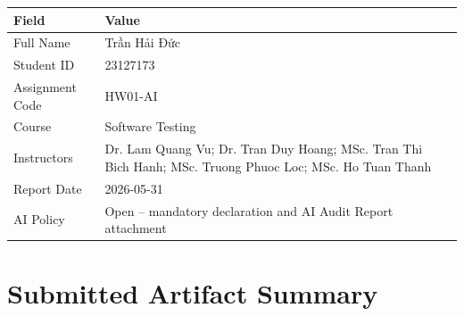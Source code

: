 \documentclass[12pt, a4paper]{article}
\begin{document}
\begin{table}[h!]
\centering
\begin{tabularx}{\textwidth}{L{4cm} X}
\toprule
\textbf{Field} & \textbf{Value} \\
\midrule
Full Name       & Trần Hải Đức \\
Student ID      & 23127173 \\
Assignment Code & HW01-AI \\
Course          & Software Testing \\
Instructors     & Dr. Lam Quang Vu; Dr. Tran Duy Hoang; MSc. Tran Thi Bich Hanh; MSc. Truong Phuoc Loc; MSc. Ho Tuan Thanh \\
Report Date     & 2026-05-31 \\
AI Policy       & Open -- mandatory declaration and AI Audit Report attachment \\
\bottomrule
\end{tabularx}
\end{table}

\section{Submitted Artifact Summary}
\end{document}

